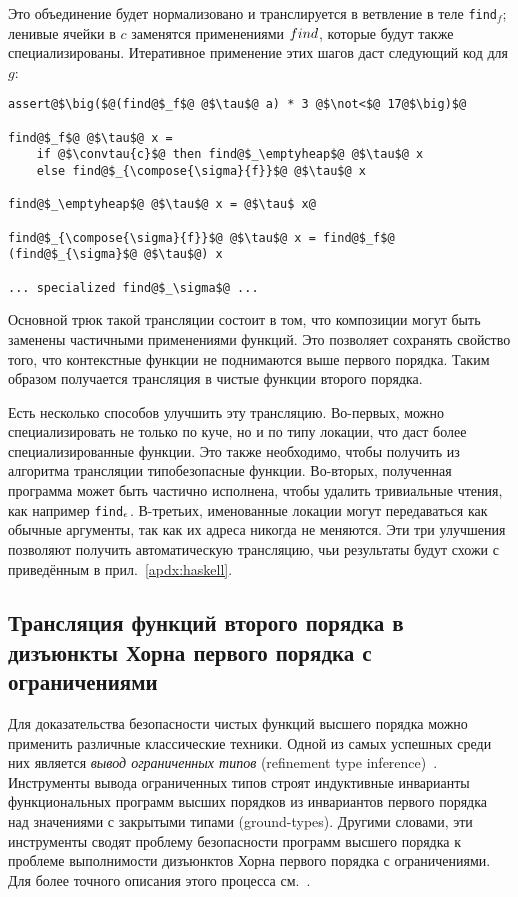 Это объединение будет нормализовано и транслируется в ветвление в теле \texttt{find}$_f$; ленивые ячейки в $c$ заменятся применениями $find$, которые будут также специализированы. Итеративное применение этих шагов даст следующий код для $g$:
\begin{lstlisting}[basicstyle=\small,escapechar=@]
assert@$\big($@(find@$_f$@ @$\tau$@ a) * 3 @$\not<$@ 17@$\big)$@

find@$_f$@ @$\tau$@ x =
	if @$\convtau{c}$@ then find@$_\emptyheap$@ @$\tau$@ x
	else find@$_{\compose{\sigma}{f}}$@ @$\tau$@ x

find@$_\emptyheap$@ @$\tau$@ x = @$\tau$ x@

find@$_{\compose{\sigma}{f}}$@ @$\tau$@ x = find@$_f$@ (find@$_{\sigma}$@ @$\tau$@) x

... specialized find@$_\sigma$@ ...

\end{lstlisting}

Основной трюк такой трансляции состоит в том, что композиции могут быть заменены частичными применениями функций. Это позволяет сохранять свойство того, что контекстные функции не поднимаются выше первого порядка. Таким образом получается трансляция в чистые функции второго порядка.

\begin{remk*}
Есть несколько способов улучшить эту трансляцию. Во-первых, можно специализировать не только по куче, но и по типу локации, что даст более специализированные функции. Это также необходимо, чтобы получить из алгоритма трансляции типобезопасные функции. Во-вторых, полученная программа может быть частично исполнена, чтобы удалить тривиальные чтения, как например \texttt{find}$_{\epsilon}$. В-третьих, именованные локации могут передаваться как обычные аргументы, так как их адреса никогда не меняются. Эти три улучшения позволяют получить автоматическую трансляцию, чьи результаты будут схожи с приведённым в прил.~\ref{apdx:haskell}.
\end{remk*}

\subsection{Трансляция функций второго порядка в дизъюнкты Хорна первого порядка с ограничениями}
Для доказательства безопасности чистых функций высшего порядка можно применить различные классические техники. Одной из самых успешных среди них является \emph{вывод ограниченных типов} (refinement type inference)~\cite{vazou2015bounded,unno2013automating,zhu2013compositional,cathcart2017higher}. Инструменты вывода ограниченных типов строят индуктивные инварианты функциональных программ высших порядков из инвариантов первого порядка над значениями с закрытыми типами (ground-types). Другими словами, эти инструменты сводят проблему безопасности программ высшего порядка к проблеме выполнимости дизъюнктов Хорна первого порядка с ограничениями. Для более точного описания этого процесса см.~\cite{cathcart2017higher}.

